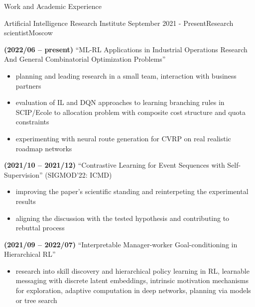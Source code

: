 \documentclass{resume} %
\begin{document}
\begin{rSection}{Work and Academic Experience}

\begin{rSubsection}{
        Artificial Intelligence Research Institute
    }{September 2021 - Present}{Research scientist}{Moscow}

    \item \textbf{(2022/06 -- present)}
    ``ML-RL Applications in Industrial Operations Research And General Combinatorial Optimization Problems''
    \begin{itemize}
        \item planning and leading research in a small team, interaction with business partners
        
        \item evaluation of IL and DQN approaches to learning branching rules in SCIP/Ecole to allocation problem with composite cost structure and quota constraints
        
        \item experimenting with neural route generation for CVRP on real realistic roadmap networks
    \end{itemize}

    \item \textbf{(2021/10 -- 2021/12)}
    ``Contrastive Learning for Event Sequences with Self-Supervision'' (SIGMOD'22: ICMD)
    \begin{itemize}
        \item improving the paper's scientific standing and reinterpeting the experimental results
        
        \item aligning the discussion with the tested hypothesis and contributing to rebuttal process
    \end{itemize}

    \item \textbf{(2021/09 -- 2022/07)}
    ``Interpretable Manager-worker Goal-conditioning in Hierarchical RL''
    \begin{itemize}
        \item research into skill discovery and hierarchical policy learning in RL, learnable messaging with discrete latent embeddings, intrinsic motivation mechanisms for exploration, adaptive computation in deep networks, planning via models or tree search
        

\end{itemize}
\end{rSubsection}
\end{rSection}
\end{document}
